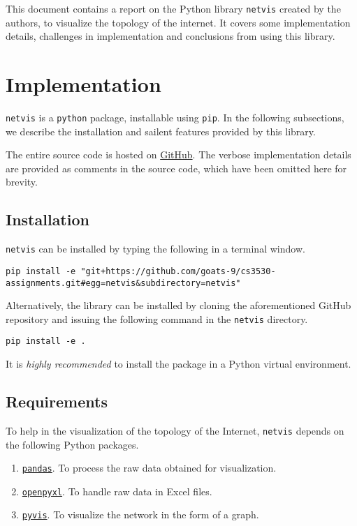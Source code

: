 \documentclass[journal,12pt,twocolumn]{IEEEtran}
\begin{document}
This document contains a report on the Python library \texttt{netvis} created by
the authors, to visualize the topology of the internet. It covers some
implementation details, challenges in implementation and conclusions from using
this library.

\section{Implementation}

\texttt{netvis} is a \texttt{python} package, installable using \texttt{pip}. In
the following subsections, we describe the installation and sailent features
provided by this library.

The entire source code is hosted on
\href{https://github.com/goats-9/cs3530-assignments/tree/main/netvis}{GitHub}.
The verbose implementation details are provided as comments in the source code,
which have been omitted here for brevity.

\subsection{Installation}

\texttt{netvis} can be installed by typing the following in a terminal window.

\begin{lstlisting}
pip install -e "git+https://github.com/goats-9/cs3530-assignments.git#egg=netvis&subdirectory=netvis"
\end{lstlisting}

Alternatively, the library can be installed by cloning the aforementioned GitHub
repository and issuing the following command in the \texttt{netvis} directory.
\begin{lstlisting}
pip install -e .
\end{lstlisting}

It is \emph{highly recommended} to install the package in a Python virtual
environment.

\subsection{Requirements}

To help in the visualization of the topology of the Internet, \texttt{netvis}
depends on the following Python packages.
\begin{enumerate}
     \item \href{https://pandas.pydata.org/}{\texttt{pandas}}. To process the
     raw data obtained for visualization.
     \item \href{https://openpyxl.readthedocs.io/en/stable/}{\texttt{openpyxl}}.
     To handle raw data in Excel files.
     \item \href{https://pyvis.readthedocs.io/en/latest/}{\texttt{pyvis}}. To
     visualize the network in the form of a graph.
\end{enumerate}
\end{document}
